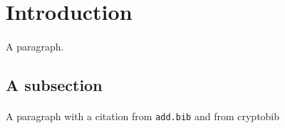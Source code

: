 \section{Introduction} \label{sec:introduction}

\paragraph{} A paragraph.

\subsection{A subsection}

\paragraph{} A paragraph with a citation from \texttt{add.bib}
\cite{renyi_szekeres_1967} and from cryptobib \cite{AC:Daemen91}
